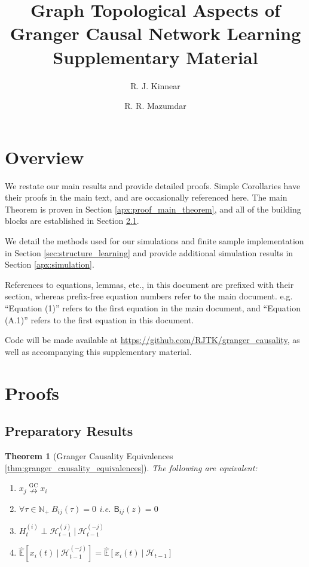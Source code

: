 \documentclass{statsoc}
\title{Graph Topological Aspects of Granger Causal Network Learning\\
  \large Supplementary Material}
\author[Author 1 {\it et al.}]{R. J. Kinnear}
\author{R. R. Mazumdar}
\newcounter{lemma}
\def\ngc{\overset{\text{GC}}{\nrightarrow}}  %
\def\B{\mathsf{B}}  %
\def\H{\mathcal{H}}  %
\newcommand{\linE}[2]{\hat{\E}[#1\ |\ #2]}  %
\newtheorem{theorem}{Theorem}
\def\H{\mathcal{H}}  %
\def\E{\mathbb{E}}  %
\def\N{\mathbb{N}}  %
\begin{document}
\appendix

\section{Overview}
We restate our main results and provide detailed proofs.  Simple
Corollaries have their proofs in the main text, and are occasionally
referenced here.  The main Theorem is proven in Section
\ref{apx:proof_main_theorem}, and all of the building blocks are
established in Section \ref{apx:ancillary_results}.

We detail the methods used for our simulations and finite sample
implementation in Section \ref{sec:structure_learning} and provide
additional simulation results in Section \ref{apx:simulation}.

References to equations, lemmas, etc., in this document are prefixed
with their section, whereas prefix-free equation numbers refer to the
main document.  e.g. ``Equation (1)'' refers to the first equation in
the main document, and ``Equation (A.1)'' refers to the first equation
in this document.

Code will be made available at
\url{https://github.com/RJTK/granger_causality}, as well as
accompanying this supplementary material.

\section{Proofs}
\subsection{Preparatory Results}
\label{apx:ancillary_results}
\begin{theorem}[Granger Causality Equivalences \ref{thm:granger_causality_equivalences}]
  The following are equivalent:

  \begin{enumerate}
  \item{$x_j \ngc x_i$}
  \item{$\forall \tau \in \N_+\ B_{ij}(\tau) = 0$ i.e. $\B_{ij}(z) = 0$}
  \item{$H_t^{(i)} \perp \H_{t - 1}^{(j)}\ |\ \H_{t - 1}^{(-j)}$}
  \item{$\linE{x_i(t)}{\H_{t - 1}^{(-j)}} = \linE{x_i(t)}{\H_{t - 1}}$}
  \end{enumerate}
\end{theorem}
\end{document}

